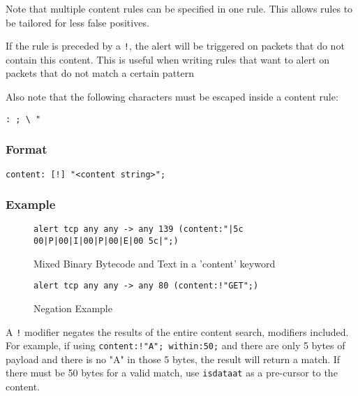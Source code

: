 \documentclass[english]{report}
\newenvironment{note}{
\samepage
    \vspace{10pt}{\textsf{
        {\hspace{7pt}\Huge{$\triangle$\hspace{-12.5pt}{\Large{$^!$}}}}\hspace{5pt}
        {\Large{NOTE}}
    }
    }
   \begin{center}
    \par\vspace{-17pt}

    \begin{lrbox}{\savepar}
    \begin{minipage}[r]{6in}
}
{
    \end{minipage}
    \end{lrbox}
    \fbox{
        \usebox{
            \savepar
	}
    }
    \par\vskip10pt
    \end{center}
}
\newenvironment{note}{
        \begin{rawhtml}
        <p><table border="1"><tr><td><b>
        Note:&nbsp;&nbsp;</b>
        \end{rawhtml}
}{
        \begin{rawhtml}
        </b></td></tr></table></p>
        \end{rawhtml}
}
\begin{document}
Note that multiple content rules can be specified in one rule. This
allows rules to be tailored for less false positives. 

If the rule is preceded by a \texttt{!}, the alert will be triggered
on packets that do not contain this content. This is useful when writing
rules that want to alert on packets that do not match a certain pattern

\begin{note}
Also note that the following characters must be escaped inside a content
rule:

\begin{verbatim}
: ; \ "
\end{verbatim}
\end{note}


\subsubsection{Format}

\begin{verbatim}
content: [!] "<content string>";
\end{verbatim}


\subsubsection{Example}

\begin{figure}[!hbpt]
\begin{verbatim}
alert tcp any any -> any 139 (content:"|5c 00|P|00|I|00|P|00|E|00 5c|";)
\end{verbatim}
\caption{\label{mixed content example}Mixed Binary Bytecode and Text in a 'content' keyword}
\end{figure}

\begin{figure}[!hbpt]
\begin{verbatim}
alert tcp any any -> any 80 (content:!"GET";)
\end{verbatim}
\caption{\label{content negation example}Negation Example}
\end{figure}

\begin{note}
A \texttt{!} modifier negates the results of the entire content search,
modifiers included.  For example, if using \texttt{content:!"A"; within:50;}
and there are only 5 bytes of payload and there is no "A" in those 5 bytes,
the result will return a match.  If there must be 50 bytes for a valid
match, use \texttt{isdataat} as a pre-cursor to the content.
\end{note}
\end{document}
